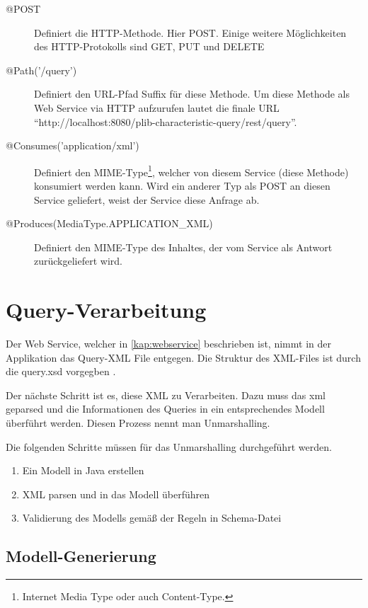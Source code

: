 \begin{description}
\item[@POST] Definiert die \gls{HTTP-Methode}. Hier POST. Einige weitere Möglichkeiten des HTTP-Protokolls sind GET, PUT und DELETE
\item[@Path('/query')] Definiert den URL-Pfad Suffix für diese Methode. Um diese Methode als Web Service via HTTP aufzurufen lautet die finale URL \enquote{http://localhost:8080/plib-characteristic-query/rest/query}. 
\item[@Consumes('application/xml')] Definiert den \gls{MIME-Type}\footnote{Internet Media Type oder auch Content-Type.}, welcher von diesem Service (diese Methode) konsumiert werden kann. Wird ein anderer Typ als POST an diesen Service geliefert, weist der Service diese Anfrage ab. 
\item[@Produces(MediaType.APPLICATION\_XML)] Definiert den \gls{MIME-Type} des Inhaltes, der vom Service als Antwort zurückgeliefert wird.  
\end{description}

% 
\section{Query-Verarbeitung}

Der \gls{Web Service}, welcher in \autoref{kap:webservice} beschrieben ist, nimmt in der Applikation das Query-XML File entgegen. 
Die Struktur des XML-Files ist durch die query.xsd vorgegben \citep[27]{iso29002-31}. 

Der nächste Schritt ist es, diese XML zu Verarbeiten. Dazu muss das xml geparsed und die Informationen des Queries in ein entsprechendes Modell überführt werden. Diesen Prozess nennt man \gls{Unmarshalling}. 

Die folgenden Schritte müssen für das Unmarshalling durchgeführt werden.

\begin{enumerate}
\item Ein Modell in Java erstellen
\item XML parsen und in das Modell überführen
\item Validierung des Modells gemäß der Regeln in Schema-Datei
\end{enumerate}

\subsection{Modell-Generierung}

